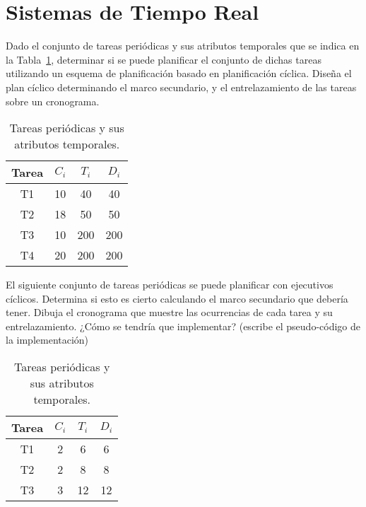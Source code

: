 \section{Sistemas de Tiempo Real}

\begin{ejercicio}\label{ej:rel4_1}
    Dado el conjunto de tareas periódicas y sus atributos temporales que se indica en la Tabla~\ref{tab:4_1}, determinar si se puede planificar el conjunto de dichas tareas utilizando un esquema de planificación basado en planificación cíclica. Diseña el plan cíclico determinando el marco secundario, y el entrelazamiento de las tareas sobre un cronograma.
    \begin{table}[H]
    \centering
    \begin{tabular}{|c|c|c|c|}
        \hline
        Tarea & $C_i$ & $T_i$ & $D_i$ \\
        \hline
        T1 & 10 & 40 & 40 \\
        \hline
        T2 & 18 & 50 & 50 \\
        \hline
        T3 & 10 & 200 & 200 \\
        \hline
        T4 & 20 & 200 & 200 \\
        \hline
    \end{tabular}
    \caption{Tareas periódicas y sus atributos temporales.}
    \label{tab:4_1}
    \end{table}
\end{ejercicio}

\begin{ejercicio}\label{ej:rel4_2}
    El siguiente conjunto de tareas periódicas se puede planificar con ejecutivos cíclicos. Determina si esto es cierto calculando el marco secundario que debería tener. Dibuja el cronograma que muestre las ocurrencias de cada tarea y su entrelazamiento. ¿Cómo se tendría que implementar? (escribe el pseudo-código de la implementación)
    \begin{table}[H]
    \centering
    \begin{tabular}{|c|c|c|c|}
        \hline
        Tarea & $C_i$ & $T_i$ & $D_i$ \\
        \hline
        T1 & 2 & 6 & 6 \\
        \hline
        T2 & 2 & 8 & 8 \\
        \hline
        T3 & 3 & 12 & 12 \\
        \hline
    \end{tabular}
    \caption{Tareas periódicas y sus atributos temporales.}
    \label{tab:4_2}
    \end{table}
\end{ejercicio}

